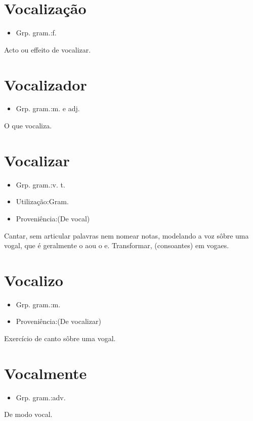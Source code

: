 \documentclass{article}
\begin{document}
\section{Vocalização}
\begin{itemize}
\item {Grp. gram.:f.}
\end{itemize}
Acto ou effeito de vocalizar.
\section{Vocalizador}
\begin{itemize}
\item {Grp. gram.:m.  e  adj.}
\end{itemize}
O que vocaliza.
\section{Vocalizar}
\begin{itemize}
\item {Grp. gram.:v. t.}
\end{itemize}
\begin{itemize}
\item {Utilização:Gram.}
\end{itemize}
\begin{itemize}
\item {Proveniência:(De \textunderscore vocal\textunderscore )}
\end{itemize}
Cantar, sem articular palavras nem nomear notas, modelando a voz sôbre uma vogal, que é geralmente o \textunderscore a\textunderscore  ou o \textunderscore e\textunderscore .
Transformar, (consoantes) em vogaes.
\section{Vocalizo}
\begin{itemize}
\item {Grp. gram.:m.}
\end{itemize}
\begin{itemize}
\item {Proveniência:(De \textunderscore vocalizar\textunderscore )}
\end{itemize}
Exercício de canto sôbre uma vogal.
\section{Vocalmente}
\begin{itemize}
\item {Grp. gram.:adv.}
\end{itemize}
De modo vocal.
\end{document}
